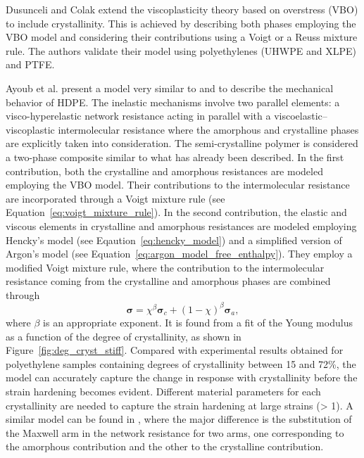 Dusunceli and Colak \citep{dusunceliModellingEffectsDegree2008} extend the viscoplasticity theory based on overstress (VBO) to include crystallinity.
This is achieved by describing both phases employing the VBO model and considering their contributions using a Voigt or a Reuss mixture rule.
The authors validate their model using polyethylenes (UHWPE and XLPE) and PTFE.

Ayoub et al. \citep{ayoubModellingLargeDeformation2010, ayoubEffectsCrystalContent2011} present a model very similar to \cite{ahziModelingDeformationBehavior2003} and \cite{boyceConstitutiveModelFinite2000} to describe the mechanical behavior of HDPE.
The inelastic mechanisms involve two parallel elements: a visco-hyperelastic network resistance acting in parallel with a viscoelastic–viscoplastic intermolecular resistance where the amorphous and crystalline phases are explicitly taken into consideration.
The semi-crystalline polymer is considered a two-phase composite similar to what has already been described.
In the first contribution, both the crystalline and amorphous resistances are modeled employing the VBO model.
Their contributions to the intermolecular resistance are incorporated through a Voigt mixture rule (see Equation~\eqref{eq:voigt_mixture_rule}).
In the second contribution, the elastic and viscous elements in crystalline and amorphous resistances are modeled employing Hencky's model (see Eqaution~\eqref{eq:hencky_model}) and a simplified version of Argon's model (see Equation~\eqref{eq:argon_model_free_enthalpy}).
They employ a modified Voigt mixture rule, where the contribution to the intermolecular resistance  coming from the crystalline and amorphous phases are combined through
\begin{equation}
  \label{eq:mod_voigt_mixture_rule}
  \bm \sigma = \chi^\beta \bm \sigma_c + (1-\chi)^\beta \bm \sigma_a,
\end{equation}
where $\beta$ is an appropriate exponent.
It is found from a fit of the Young modulus as a function of the degree of crystallinity, as shown in Figure~\ref{fig:deg_cryst_stiff}.
Compared with experimental results obtained for polyethylene samples containing degrees of crystallinity between 15 and 72\%, the model can accurately capture the change in response with crystallinity before the strain hardening becomes evident.
Different material parameters for each crystallinity are needed to capture the strain hardening at large strains (> 1).
A similar model can be found in \cite{abdul-hameedTwophaseHyperelasticviscoplasticConstitutive2014}, where the major difference is the substitution of the Maxwell arm in the network resistance for two arms, one corresponding to the amorphous contribution and the other to the crystalline contribution.

